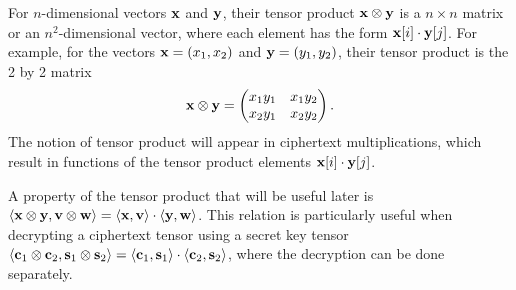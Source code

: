 \documentclass[../main.tex]{subfiles}
\begin{document}
For $n$-dimensional vectors $\mathbf{x}$ and $\mathbf{y}$, 
\reversemarginpar
{}
their tensor product $\mathbf{x} \otimes \mathbf{y}$ is a $n \times n$ matrix or an $n^2$-dimensional vector, where each element has the form $\mathbf{x}[i] \cdot \mathbf{y}[j]$. For example, for the vectors $\mathbf{x}=(x_1,x_2)$ and $\mathbf{y}=(y_1,y_2)$, their tensor product is the 2 by 2 matrix 
\begin{equation*}
\mathbf{x} \otimes \mathbf{y} =
\begin{pmatrix}
x_1 y_1 & x_1 y_2 \\
x_2 y_1 & x_2 y_2
\end{pmatrix}.
\end{equation*}
The notion of tensor product will appear in ciphertext multiplications, which result in functions of the tensor product elements $\mathbf{x}[i] \cdot \mathbf{y}[j]$. 

A property of the tensor product that will be useful later is $\langle \mathbf{x} \otimes \mathbf{y}, \mathbf{v} \otimes \mathbf{w} \rangle = \langle \mathbf{x}, \mathbf{v} \rangle \cdot \langle \mathbf{y}, \mathbf{w} \rangle$. This relation is particularly useful when decrypting a ciphertext tensor using a secret key tensor $\langle \mathbf{c}_1 \otimes \mathbf{c}_2, \mathbf{s}_1 \otimes \mathbf{s}_2 \rangle = \langle \mathbf{c}_1, \mathbf{s}_1 \rangle \cdot \langle \mathbf{c}_2, \mathbf{s}_2 \rangle$, where the decryption can be done separately. %
\end{document}
